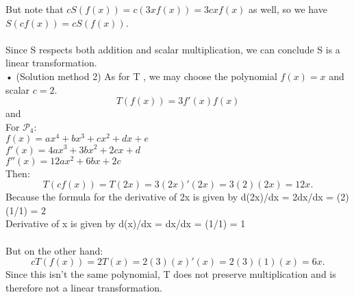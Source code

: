 \documentclass{article}
\begin{document}
But note that $cS(f(x))=c(3xf(x))=3cxf(x)$ as well, so we have $S(cf(x))=cS(f(x))$. \\
\\
Since S respects both addition and scalar multiplication, we can conclude S is a linear transformation.\\

• (Solution method 2) As for T , we may choose the polynomial $f(x)=x$
and scalar $c=2$. 
\begin{equation*}
T(f(x)) = 3f'(x)f(x)
\end{equation*}
and\\
For $ \mathcal{P}_4$:\\
$f(x) = ax^4 + bx^3 + cx^2 + dx + e$\\
$f'(x) = 4ax^3 + 3bx^2 + 2cx + d$\\
$f''(x) = 12ax^2 + 6bx + 2c$\\

Then:\\
\begin{equation*}
T(cf(x))=T(2x)=3(2x)'(2x)=3(2)(2x)=12x.
\end{equation*}
Because the formula for the derivative of 2x is given by d(2x)/dx = 2dx/dx = (2)(1/1) = 2\\
Derivative of x is given by d(x)/dx = dx/dx = (1/1) = 1\\

\\
But on the other hand:
\begin{equation*}
cT(f(x))=2T(x)=2(3)(x)'(x)=2(3)(1)(x)=6x.
\end{equation*}
Since this isn’t the same polynomial, T does not preserve multiplication
and is therefore not a linear transformation.

\newpage
\end{document}
